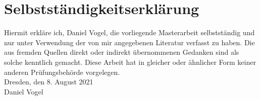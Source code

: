 \chapter*{Selbstständigkeitserklärung}
\thispagestyle{empty}

\noindent
Hiermit erkläre ich, Daniel Vogel, die vorliegende Masterarbeit selbstständig und nur unter Verwendung der von mir angegebenen Literatur verfasst zu haben. Die aus fremden Quellen direkt oder indirekt übernommenen Gedanken sind als solche kenntlich gemacht. Diese Arbeit hat in gleicher oder ähnlicher Form keiner anderen Prüfungsbehörde vorgelegen.\\[3em]

\noindent
Dresden, den 8. August 2021\\[3em]

\noindent
Daniel Vogel
